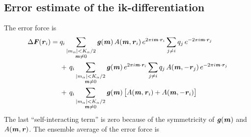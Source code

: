 \documentclass[aps,pre,preprint]{revtex4}
\renewcommand{\v}[1]{\textbf{\textit{#1}}}
\begin{document}
\subsection{Error estimate of the ik-differentiation}
The error force is 
\begin{align}\nonumber
  \Delta\v F(\v r_i)
  =\;&
  q_i
  \sum_{
    \begin{subarray}{c}
      \vert m_{\alpha}\vert < K_\alpha/2\\
      \v m\neq 0
    \end{subarray}}
  \v g(\v m)\,
  A(\v m, \v r_i)\,
  e^{2\pi i\v m\cdot \v r_i}
  \sum_{j\neq i}q_j\,e^{-2\pi i\v m\cdot\v r_j} \\\nonumber
  & +\,
  q_i
  \sum_{
    \begin{subarray}{c}
      \vert m_{\alpha}\vert < K_\alpha/2\\
      \v m\neq 0
    \end{subarray}}
  \v g(\v m)\,
  e^{2\pi i\v m\cdot \v r_i}
  \sum_{j\neq i}q_j\,A(\v m, -\v r_j)\,e^{-2\pi i\v m\cdot\v r_j}\\\nonumber
  & +\,
  q_i
  \sum_{
    \begin{subarray}{c}
      \vert m_{\alpha}\vert < K_\alpha/2\\
      \v m\neq 0
    \end{subarray}}
  \v g(\v m)\,
  \big[
  A(\v m, \v r_i) +
  A(\v m, -\v r_i)
  \big]
\end{align}
The last ``self-interacting term'' is zero because of the symmetricity
of $\v g(\v m)$ and $A(\v m, \v r)$. The ensemble average of the error force is
\end{document}
